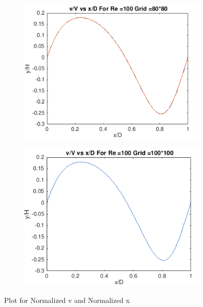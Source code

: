 \documentclass{article}
\begin{document}
\begin{figure}
  \begin{subfigure}[b]{0.5\textwidth}
    \includegraphics[width=\textwidth]{21.png}
  \end{subfigure}
  \begin{subfigure}[b]{0.5\textwidth}
    \includegraphics[width=\textwidth]{22.png}
  \end{subfigure}
      \caption{Plot for Normalized v and Normalized x}
\label{fig:res4s}
\end{figure}
\end{document}

